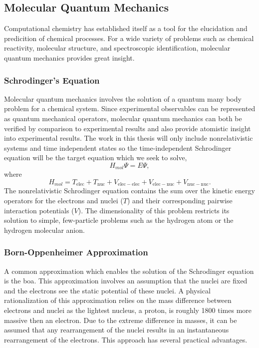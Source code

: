 \subsection{Molecular Quantum Mechanics}
Computational chemistry has established itself as a tool for the elucidation and predicition of chemical processes.
For a wide variety of problems such as chemical reactivity, molecular structure, and spectroscopic identification, molecular quantum mechanics provides great insight.

\subsubsection{Schrodinger's Equation}
Molecular quantum mechanics involves the solution of a quantum many body problem for a chemical system. Since experimental observables can be represented as quantum mechanical operators, molecular quantum mechanics can both be verified by comparison to experimental results and also provide atomistic insight into experimental results.
The work in this thesis will only include nonrelativistic systems and time independent states so the time-independent Schrodinger equation will be the target equation which we seek to solve,
\begin{equation}
H_{mol} \Psi = E \Psi,
\end{equation}
where
\begin{equation}
H_{mol} = T_{\mathrm{elec}} + T_{\mathrm{nuc}} + V_{\mathrm{elec-elec}} + V_{\mathrm{elec-nuc}} + V_{\mathrm{nuc-nuc}}.
\end{equation}
The nonrelativistic Schrodinger equation contains the sum over the kinetic energy operators for the electrons and nuclei ($T$) and their corresponding pairwise interaction potentials ($V$).
The dimensionality of this problem restricts its solution to simple, few-particle problems such as the hydrogen atom or the hydrogen molecular anion.

\subsubsection{Born-Oppenheimer Approximation}
A common approximation which enables the solution of the Schrodinger equation is the \gls{boa}.
This approximation involves an assumption that the nuclei are fixed and the electrons see the static potential of these nuclei.
A physical rationalization of this approximation relies on the mass difference between electrons and nuclei as the lightest nucleus, a proton, is roughly 1800 times more massive then an electron.
Due to the extreme difference in masses, it can be assumed that any rearrangement of the nuclei results in an instantaneous rearrangement of the electrons.
This approach has several practical advantages.

